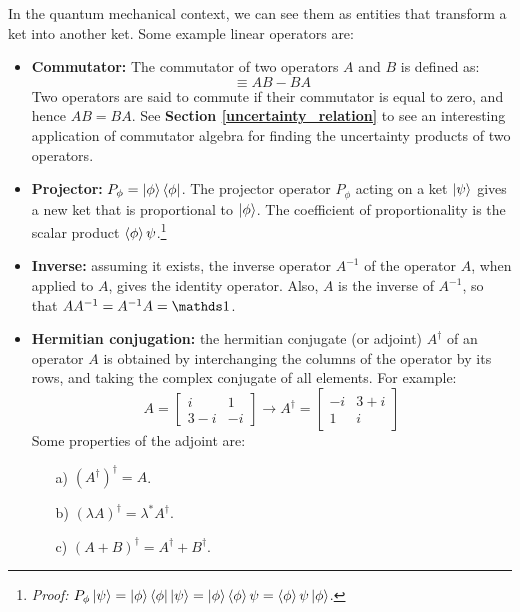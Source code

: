 In the quantum mechanical context, we can see them as entities that transform a ket into another ket. Some example linear operators are:
\begin{itemize}
    \item \textbf{Commutator:} The commutator of two operators $A$ and $B$ is defined as:
    \begin{equation}
        [A, B] \equiv AB - BA
    \end{equation}
    Two operators are said to commute if their commutator is equal to zero, and hence $AB = BA$. See \textbf{Section \ref{uncertainty_relation}} to see an interesting application of commutator algebra for finding the uncertainty products of two operators.
    \item \textbf{Projector:} $P_\phi = \ket{\phi}\bra{\phi}$. The projector operator $P_\phi$ acting on a ket $\ket{\psi}$ gives a new ket that is proportional to $\ket{\phi}$. The coefficient of proportionality is the scalar product $\braket{\phi}{\psi}$.\footnote{\textit{Proof:} $P_\phi\ket{\psi} = \ket{\phi}\bra{\phi}\ket{\psi} = \ket{\phi}\braket{\phi}{\psi} = \braket{\phi}{\psi}\ket{\phi}$.}
    \item \textbf{Inverse:} assuming it exists, the inverse operator $A^{-1}$ of the operator $A$, when applied to $A$, gives the identity operator. Also, $A$ is the inverse of $A^{-1}$, so that $AA^{-1} = A^{-1}A = \Imat$.
    \item \textbf{Hermitian conjugation:} the hermitian conjugate (or adjoint) $A^\dagger$ of an operator $A$ is obtained by interchanging the columns of the operator by its rows, and taking the complex conjugate of all elements. For example:
    \begin{equation}
        A = \begin{bmatrix}
            i & 1 \\
            3-i & -i
        \end{bmatrix}\rightarrow
        A^\dagger = \begin{bmatrix}
            -i & 3 + i \\
            1 & i
        \end{bmatrix}
    \end{equation}
    Some properties of the adjoint are:
    \begin{enumerate}
        \item[a)] $\left(A^\dagger\right)^\dagger = A$.
        \item[b)] $\left(\lambda A\right)^\dagger = \lambda^*A^\dagger$.
        \item[c)] $\left(A + B\right)^\dagger = A^\dagger + B^\dagger$.

\end{enumerate}
\end{itemize}
